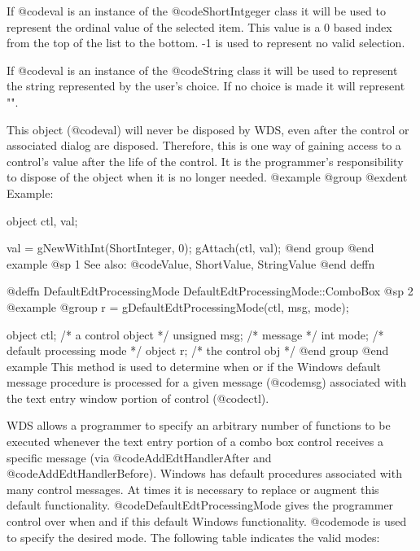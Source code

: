 If @code{val} is an instance of the @code{ShortIntgeger} class it will
be used to represent the ordinal value of the selected item.  This value
is a 0 based index from the top of the list to the bottom.  -1 is used
to represent no valid selection.

If @code{val} is an instance of the @code{String} class it will be used
to represent the string represented by the user's choice.  If no choice is
made it will represent "".

This object (@code{val}) will never be disposed by WDS, even after
the control or associated dialog are disposed.  Therefore, this
is one way of gaining access to a control's value after the life
of the control.  It is the programmer's responsibility to dispose of
the object when it is no longer needed.
@example
@group
@exdent Example:

object  ctl, val;

val = gNewWithInt(ShortInteger, 0);
gAttach(ctl, val);
@end group
@end example
@sp 1
See also:  @code{Value, ShortValue, StringValue}
@end deffn












@deffn {DefaultEdtProcessingMode} DefaultEdtProcessingMode::ComboBox
@sp 2
@example
@group
r = gDefaultEdtProcessingMode(ctl, msg, mode);

object   ctl;   /*  a control object         */
unsigned msg;   /*  message                  */
int      mode;  /*  default processing mode  */
object   r;     /*  the control obj          */
@end group
@end example
This method is used to determine when or if the Windows default message
procedure is processed for a given message (@code{msg}) associated with
the text entry window portion of control (@code{ctl}).

WDS allows a programmer to specify an arbitrary number of functions to
be executed whenever the text entry portion of a combo box control
receives a specific message (via @code{AddEdtHandlerAfter} and
@code{AddEdtHandlerBefore}).  Windows has default procedures associated
with many control messages.  At times it is necessary to replace or
augment this default functionality.  @code{DefaultEdtProcessingMode}
gives the programmer control over when and if this default Windows
functionality.  @code{mode} is used to specify the desired mode.  The
following table indicates the valid modes:

